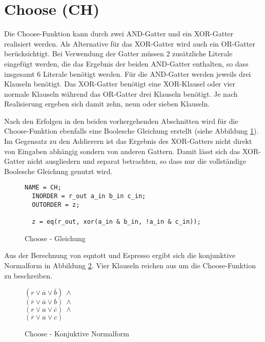 \section{Choose (CH)}
\label{sec:knf:ch}

Die Choose-Funktion kann durch zwei AND-Gatter und ein XOR-Gatter realisiert werden. Als Alternative für das XOR-Gatter wird auch ein OR-Gatter berücksichtigt.
Bei Verwendung der Gatter müssen 2 zusätzliche Literale eingefügt werden, die das Ergebnis der beiden AND-Gatter enthalten, so dass insgesamt 6 Literale benötigt werden.
Für die AND-Gatter werden jeweils drei Klauseln benötigt. Das XOR-Gatter benötigt eine XOR-Klausel oder vier normale Klauseln während das OR-Gatter drei Klauseln benötigt.
Je nach Realisierung ergeben sich damit zehn, neun oder sieben Klauseln.

Nach den Erfolgen in den beiden vorhergehenden Abschnitten wird für die Choose-Funktion ebenfalls eine Boolesche Gleichung erstellt (siehe Abbildung \ref{fig:choose_eqn}).
Im Gegensatz zu den Addierern ist das Ergebnis des XOR-Gatters nicht direkt von Eingaben abhängig sondern von anderen Gattern. Damit lässt sich das XOR-Gatter nicht
ausgliedern und separat betrachten, so dass nur die vollständige Boolesche Gleichung genutzt wird.
\begin{figure}[!h]
  \centering
  \begin{lstlisting}[]
  NAME = CH;
  INORDER = r_out a_in b_in c_in;
  OUTORDER = z;

  z = eq(r_out, xor(a_in & b_in, !a_in & c_in));
  \end{lstlisting}
  \caption{Choose - Gleichung}
  \label{fig:choose_eqn}
\end{figure}

Aus der Berechnung von eqntott und Espresso ergibt sich die konjunktive Normalform in Abbildung \ref{fig:choose_cnf}.
Vier Klauseln reichen aus um die Choose-Funktion zu beschreiben.
\begin{figure}[!h]
  \centering
  \begin{minipage}[l]{2cm}
    $ (r \vee \overline{a} \vee \overline{b}) ~ \wedge $\\
    $ (\overline{r} \vee \overline{a} \vee b) ~ \wedge $\\
    $ (r \vee a \vee \overline{c}) ~ \wedge $\\
    $ (\overline{r} \vee a \vee c) $
  \end{minipage}
  \caption{Choose - Konjuktive Normalform}
  \label{fig:choose_cnf}
\end{figure}

